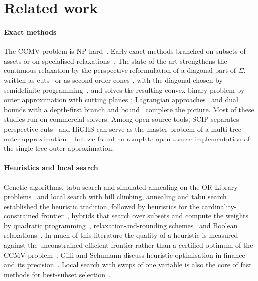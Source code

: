 \section{Related work}\label{sec:related}

\paragraph{Exact methods} The CCMV problem is NP-hard~\cite{gao2013optimal}. Early exact methods branched on subsets of
assets or on specialised relaxations~\cite{bienstock1996computational,bertsimas2007algorithm}. The state of the art
strengthens the continuous relaxation by the perspective reformulation of a diagonal part of $\Sigma$, written as
cuts~\cite{frangioni2005perspective,frangioni2009computational} or as second-order cones~\cite{gunluk2010perspective,akturk2009strong},
with the diagonal chosen by semidefinite programming~\cite{frangioni2007sdp,zheng2014improving}, and solves the resulting
convex binary problem by outer approximation with cutting planes~\cite{bertsimas2022scalable,wei2023outer}; Lagrangian
approaches~\cite{shaw2008lagrangian,gao2013optimal} and dual bounds with a depth-first branch and
bound~\cite{xu2024efficient} complete the picture. Most of these studies run on commercial solvers. Among open-source
tools, SCIP separates perspective cuts~\cite{bestuzheva2023computational,bolusani2024scip} and HiGHS can serve as the
master problem of a multi-tree outer approximation~\cite{huangfu2017parallelizing}, but we found no complete open-source
implementation of the single-tree outer approximation.

\paragraph{Heuristics and local search} Genetic algorithms, tabu search and simulated annealing on the OR-Library
problems~\cite{chang2000heuristics} and local search with hill climbing, annealing and tabu
search~\cite{schaerf2002local} established the heuristic tradition, followed by heuristics for the cardinality-constrained
frontier~\cite{woodsideoriakhi2011heuristic}, hybrids that search over subsets and compute the weights by quadratic
programming~\cite{digaspero2011hybrid,akbay2020parallel}, relaxation-and-rounding schemes~\cite{fu2023comparative} and Boolean
relaxations~\cite{moka2025scalable}. In much of this literature the quality of a heuristic is measured against the
unconstrained efficient frontier rather than a certified optimum of the CCMV problem~\cite{chang2000heuristics,mansouri2021markowitz}.
Gilli and Schumann discuss heuristic optimisation in finance and its precision~\cite{gilli2012heuristic,gilli2011optimal}.
Local search with swaps of one variable is also the core of fast methods for best-subset
selection~\cite{hazimeh2020fast}.

